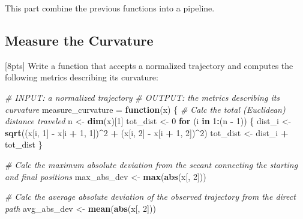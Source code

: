 \documentclass[]{article}
\newenvironment{Shaded}{\begin{snugshade}}{\end{snugshade}}
\newcommand{\CommentTok}[1]{\textcolor[rgb]{0.56,0.35,0.01}{\textit{#1}}}
\newcommand{\ControlFlowTok}[1]{\textcolor[rgb]{0.13,0.29,0.53}{\textbf{#1}}}
\newcommand{\DecValTok}[1]{\textcolor[rgb]{0.00,0.00,0.81}{#1}}
\newcommand{\KeywordTok}[1]{\textcolor[rgb]{0.13,0.29,0.53}{\textbf{#1}}}
\newcommand{\NormalTok}[1]{#1}
\newcommand{\OperatorTok}[1]{\textcolor[rgb]{0.81,0.36,0.00}{\textbf{#1}}}
\newcommand{\StringTok}[1]{\textcolor[rgb]{0.31,0.60,0.02}{#1}}
\begin{document}
This part combine the previous functions into a pipeline.

\hypertarget{measure-the-curvature}{%
\subsection{Measure the Curvature}\label{measure-the-curvature}}

{[}8pts{]} Write a function that accepts a normalized trajectory and
computes the following metrics describing its curvature:

\begin{Shaded}
\begin{Highlighting}[]
\CommentTok{# INPUT: a normalized trajectory}
\CommentTok{# OUTPUT:  the metrics describing its curvature }
\NormalTok{measure_curvature =}\StringTok{ }\ControlFlowTok{function}\NormalTok{(x) \{}
  \CommentTok{# Calc the total (Euclidean) distance traveled}
\NormalTok{  n <-}\StringTok{ }\KeywordTok{dim}\NormalTok{(x)[}\DecValTok{1}\NormalTok{]}
\NormalTok{  tot_dist <-}\StringTok{ }\DecValTok{0}
  \ControlFlowTok{for}\NormalTok{ (i }\ControlFlowTok{in} \DecValTok{1}\OperatorTok{:}\NormalTok{(n }\OperatorTok{-}\StringTok{ }\DecValTok{1}\NormalTok{)) \{}
\NormalTok{    dist_i <-}\StringTok{ }\KeywordTok{sqrt}\NormalTok{((x[i, }\DecValTok{1}\NormalTok{] }\OperatorTok{-}\StringTok{ }\NormalTok{x[i }\OperatorTok{+}\StringTok{ }\DecValTok{1}\NormalTok{, }\DecValTok{1}\NormalTok{])}\OperatorTok{^}\DecValTok{2} \OperatorTok{+}\StringTok{ }\NormalTok{(x[i, }\DecValTok{2}\NormalTok{] }\OperatorTok{-}\StringTok{ }\NormalTok{x[i }\OperatorTok{+}\StringTok{ }\DecValTok{1}\NormalTok{, }\DecValTok{2}\NormalTok{])}\OperatorTok{^}\DecValTok{2}\NormalTok{)}
\NormalTok{    tot_dist <-}\StringTok{ }\NormalTok{dist_i }\OperatorTok{+}\StringTok{ }\NormalTok{tot_dist}
\NormalTok{  \}}
  
  \CommentTok{# Calc the maximum absolute deviation from the secant connecting the starting and final positions}
\NormalTok{  max_abs_dev <-}\StringTok{ }\KeywordTok{max}\NormalTok{(}\KeywordTok{abs}\NormalTok{(x[, }\DecValTok{2}\NormalTok{])) }
  
  \CommentTok{# Calc the average absolute deviation of the observed trajectory from the direct path}
\NormalTok{  avg_abs_dev <-}\StringTok{ }\KeywordTok{mean}\NormalTok{(}\KeywordTok{abs}\NormalTok{(x[, }\DecValTok{2}\NormalTok{]))}
  

\end{Highlighting}
\end{Shaded}
\end{document}
